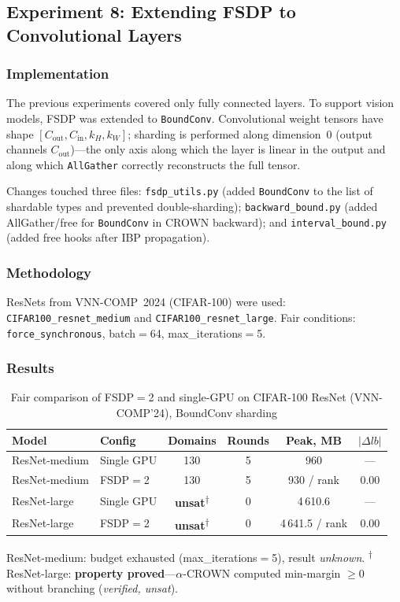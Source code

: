 \subsection{Experiment 8: Extending FSDP to Convolutional Layers}
\label{sec:exp8}

\subsubsection{Implementation}

The previous experiments covered only fully connected layers. To support
vision models, FSDP was extended to \texttt{BoundConv}. Convolutional weight
tensors have shape $[C_\text{out}, C_\text{in}, k_H, k_W]$; sharding is
performed along dimension~0 (output channels $C_\text{out}$)---the only axis
along which the layer is linear in the output and along which \texttt{AllGather}
correctly reconstructs the full tensor.

Changes touched three files: \texttt{fsdp\_utils.py} (added \texttt{BoundConv}
to the list of shardable types and prevented double-sharding);
\texttt{backward\_bound.py} (added AllGather/free for \texttt{BoundConv} in
CROWN backward); and \texttt{interval\_bound.py} (added free hooks after IBP
propagation).

\subsubsection{Methodology}

ResNets from VNN-COMP~2024 (CIFAR-100) were used:
\texttt{CIFAR100\_resnet\_medium} and \texttt{CIFAR100\_resnet\_large}.
Fair conditions: \texttt{force\_synchronous}, batch$=$64, max\_iterations$=$5.

\subsubsection{Results}

\begin{table}[htbp]
\centering
\caption{Fair comparison of FSDP$=$2 and single-GPU on CIFAR-100 ResNet
(VNN-COMP'24), BoundConv sharding}
\label{tab:fsdp-conv}
\begin{tabular}{llcccc}
\toprule
Model & Config & Domains & Rounds & Peak, MB & $|\Delta lb|$ \\
\midrule
ResNet-medium & Single GPU & 130 & 5 &   960 & --- \\
ResNet-medium & FSDP$=$2   & 130 & 5 &   930 / rank & 0.00 \\
ResNet-large  & Single GPU & \textbf{unsat}\textsuperscript{$\dagger$} & 0 & 4\,610.6 & --- \\
ResNet-large  & FSDP$=$2   & \textbf{unsat}\textsuperscript{$\dagger$} & 0 & 4\,641.5 / rank & 0.00 \\
\bottomrule
\end{tabular}
\end{table}
ResNet-medium: budget exhausted (max\_iterations$=$5), result \emph{unknown}.
\textsuperscript{$\dagger$}ResNet-large: \textbf{property proved}---$\alpha$-CROWN
computed min-margin $\ge 0$ without branching (\emph{verified, unsat}).

